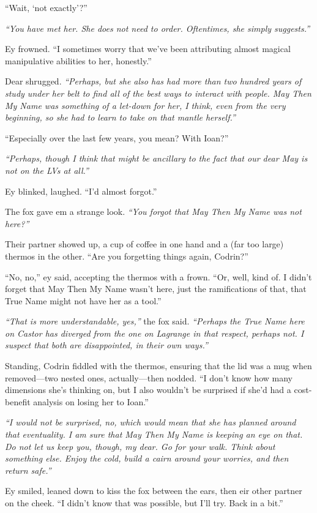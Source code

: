 ``Wait, `not exactly'?''

\emph{``You have met her. She does not need to order. Oftentimes, she simply suggests.''}

Ey frowned. ``I sometimes worry that we've been attributing almost magical manipulative abilities to her, honestly.''

Dear shrugged. \emph{``Perhaps, but she also has had more than two hundred years of study under her belt to find all of the best ways to interact with people. May Then My Name was something of a let-down for her, I think, even from the very beginning, so she had to learn to take on that mantle herself.''}

``Especially over the last few years, you mean? With Ioan?''

\emph{``Perhaps, though I think that might be ancillary to the fact that our dear May is not on the LVs at all.''}

Ey blinked, laughed. ``I'd almost forgot.''

The fox gave em a strange look. \emph{``You forgot that May Then My Name was not here?''}

Their partner showed up, a cup of coffee in one hand and a (far too large) thermos in the other. ``Are you forgetting things again, Codrin?''

``No, no,'' ey said, accepting the thermos with a frown. ``Or, well, kind of. I didn't forget that May Then My Name wasn't here, just the ramifications of that, that True Name might not have her as a tool.''

\emph{``That is more understandable, yes,''} the fox said. \emph{``Perhaps the True Name here on Castor has diverged from the one on Lagrange in that respect, perhaps not. I suspect that both are disappointed, in their own ways.''}

Standing, Codrin fiddled with the thermos, ensuring that the lid was a mug when removed—two nested ones, actually—then nodded. ``I don't know how many dimensions she's thinking on, but I also wouldn't be surprised if she'd had a cost-benefit analysis on losing her to Ioan.''

\emph{``I would not be surprised, no, which would mean that she has planned around that eventuality. I am sure that May Then My Name is keeping an eye on that. Do not let us keep you, though, my dear. Go for your walk. Think about something else. Enjoy the cold, build a cairn around your worries, and then return safe.''}

Ey smiled, leaned down to kiss the fox between the ears, then eir other partner on the cheek. ``I didn't know that was possible, but I'll try. Back in a bit.''

